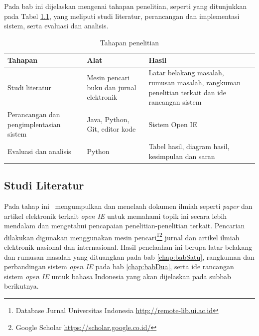 \chapter{\babTiga}
\label{chap:babTiga}

Pada bab ini dijelaskan mengenai tahapan penelitian, seperti yang ditunjukkan pada Tabel \ref{tab:tahapan_penelitian}, yang meliputi studi literatur, perancangan dan implementasi sistem, serta evaluasi dan analisis.

\begin{table}
\centering
\caption{Tahapan penelitian}
\label{tab:tahapan_penelitian}
\begin{tabular}{p{3.5cm} p{4.5cm} p{4.5cm}}
\hline
\textbf{Tahapan} & \textbf{Alat} & \textbf{Hasil} \\
\hline
Studi literatur & Mesin pencari buku dan jurnal elektronik & Latar belakang masalah, rumusan masalah, rangkuman penelitian terkait dan ide rancangan sistem \\
\hline
Perancangan dan pengimplentasian sistem & Java, Python, Git, editor kode & Sistem Open IE \\
\hline
Evaluasi dan analisis & Python & Tabel hasil, diagram hasil, kesimpulan dan saran \\
\hline
\end{tabular}
\end{table}

\section{Studi Literatur}

Pada tahap ini \saya~mengumpulkan dan menelaah dokumen ilmiah seperti \textit{paper} dan artikel elektronik terkait \textit{open IE} untuk memahami topik ini secara lebih mendalam dan mengetahui pencapaian penelitian-penelitian terkait. Pencarian dilakukan digunakan menggunakan mesin pencari\footnote{Database Jurnal Universitas Indonesia \url{http://remote-lib.ui.ac.id}}\footnote{Google Scholar \url{https://scholar.google.co.id/}} jurnal dan artikel ilmiah elektronik nasional dan internasional. Hasil penelaahan ini berupa latar belakang dan rumusan masalah yang dituangkan pada bab \ref{chap:babSatu}, rangkuman dan perbandingan sistem \textit{open IE} pada bab \ref{chap:babDua}, serta ide rancangan sistem \textit{open IE} untuk bahasa Indonesia yang akan dijelaskan pada subbab berikutnya.


